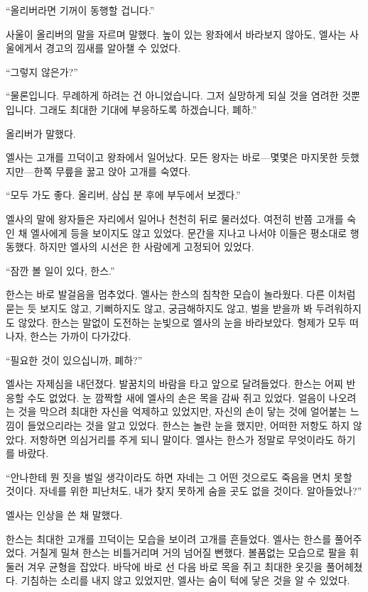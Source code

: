 ``올리버라면 기꺼이 동행할 겁니다.''

사울이 올리버의 말을 자르며 말했다. 높이 있는 왕좌에서 바라보지 않아도, 엘사는 사울에게서 경고의 낌새를 알아챌 수 있었다.

``그렇지 않은가?''

``물론입니다. 무례하게 하려는 건 아니었습니다. 그저 실망하게 되실 것을 염려한 것뿐입니다. 그래도 최대한 기대에 부응하도록 하겠습니다, 폐하.''

올리버가 말했다.

엘사는 고개를 끄덕이고 왕좌에서 일어났다. 모든 왕자는 바로—몇몇은 마지못한 듯했지만—한쪽 무릎을 꿇고 앉아 고개를 숙였다.

``모두 가도 좋다. 올리버, 삼십 분 후에 부두에서 보겠다.''

엘사의 말에 왕자들은 자리에서 일어나 천천히 뒤로 물러섰다. 여전히 반쯤 고개를 숙인 채 엘사에게 등을 보이지도 않고 있었다. 문간을 지나고 나서야 이들은 평소대로 행동했다. 하지만 엘사의 시선은 한 사람에게 고정되어 있었다.

``잠깐 볼 일이 있다, 한스.''

한스는 바로 발걸음을 멈추었다. 엘사는 한스의 침착한 모습이 놀라웠다. 다른 이처럼 묻는 듯 보지도 않고, 기뻐하지도 않고, 궁금해하지도 않고, 벌을 받을까 봐 두려워하지도 않았다. 한스는 말없이 도전하는 눈빛으로 엘사의 눈을 바라보았다. 형제가 모두 떠나자, 한스는 가까이 다가갔다.

``필요한 것이 있으십니까, 폐하?''

엘사는 자제심을 내던졌다. 발꿈치의 바람을 타고 앞으로 달려들었다. 한스는 어찌 반응할 수도 없었다. 눈 깜짝할 새에 엘사의 손은 목을 감싸 쥐고 있었다. 얼음이 나오려는 것을 막으려 최대한 자신을 억제하고 있었지만, 자신의 손이 닿는 것에 얼어붙는 느낌이 들었으리라는 것을 알고 있었다. 한스는 놀란 눈을 했지만, 어떠한 저항도 하지 않았다. 저항하면 의심거리를 주게 되니 말이다. 엘사는 한스가 정말로 무엇이라도 하기를 바랐다.

``안나한테 뭔 짓을 벌일 생각이라도 하면 자네는 그 어떤 것으로도 죽음을 면치 못할 것이다. 자네를 위한 피난처도, 내가 찾지 못하게 숨을 곳도 없을 것이다. 알아들었나?''

엘사는 인상을 쓴 채 말했다.

한스는 최대한 고개를 끄덕이는 모습을 보이려 고개를 흔들었다. 엘사는 한스를 풀어주었다. 거칠게 밀쳐 한스는 비틀거리며 거의 넘어질 뻔했다. 볼품없는 모습으로 팔을 휘둘러 겨우 균형을 잡았다. 바닥에 바로 선 다음 바로 목을 쥐고 최대한 옷깃을 풀어헤쳤다. 기침하는 소리를 내지 않고 있었지만, 엘사는 숨이 턱에 닿은 것을 알 수 있었다.

